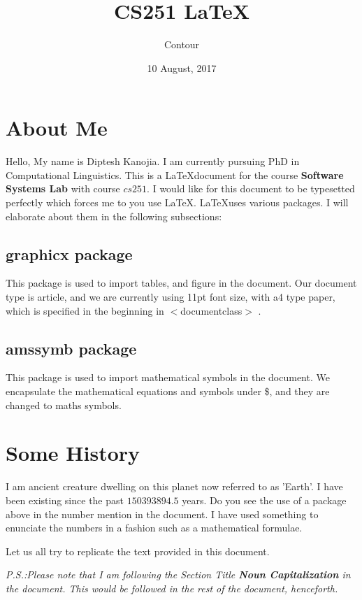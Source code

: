 \documentclass[titlepage,11pt,a4paper]{article}
\begin{document}
\hypersetup{
    colorlinks=false
}

\title{\bf \Huge CS251 \LaTeX}
\date{10 August, 2017}
\author{\LARGE Contour}
\maketitle

\tableofcontents


\newpage


\section{About Me}
Hello, My name is Diptesh Kanojia. I am currently pursuing PhD in Computational
Linguistics. This is a \LaTeX document for the course \textbf{Software Systems Lab}
with course $cs251$. I would like for this document to be typesetted perfectly which
forces me to you use \LaTeX. \LaTeX uses various packages. I will elaborate about
them in the following subsections:
\subsection{graphicx package}
This package is used to import tables, and figure in the document. Our document type
is article, and we are currently using 11pt font size, with
a4 type paper, which is specified in the beginning in $<$documentclass$>$ .

\subsection{amssymb package}
This package is used to import mathematical symbols in the document. We encapsulate
the mathematical equations and symbols under \$, and they are changed to maths
symbols.
\section{Some History}
I am ancient creature dwelling on this planet now referred to as ’Earth’. I have
been existing since the past $150393894.5$ years. Do you see the use of a package
above in the number mention in the document. I have used something to enunciate the
numbers in a fashion such as a mathematical formulae.

\indent Let us all try to replicate the text provided in this document.

\indent \textit{P.S.:Please note that I am following the Section Title \textbf{Noun
Capitalization} in the document. This would be followed in the rest of the document,
henceforth.}
\end{document}
